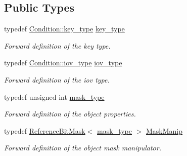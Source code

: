 \subsection*{Public Types}
\begin{DoxyCompactItemize}
\item 
typedef \hyperlink{class_d_d4hep_1_1_conditions_1_1_condition_a7528efa762e8cc072ef80ea67c3531f9}{Condition\+::key\+\_\+type} \hyperlink{class_d_d4hep_1_1_conditions_1_1_interna_1_1_condition_object_a61a3251d047bd75dcdebb0e1c1409101}{key\+\_\+type}
\begin{DoxyCompactList}\small\item\em Forward definition of the key type. \end{DoxyCompactList}\item 
typedef \hyperlink{class_d_d4hep_1_1_conditions_1_1_condition_ad84300e226b2085ec5e9db7f47be5539}{Condition\+::iov\+\_\+type} \hyperlink{class_d_d4hep_1_1_conditions_1_1_interna_1_1_condition_object_a6d54716450a73a1a439ca06445f56d24}{iov\+\_\+type}
\begin{DoxyCompactList}\small\item\em Forward definition of the iov type. \end{DoxyCompactList}\item 
typedef unsigned int \hyperlink{class_d_d4hep_1_1_conditions_1_1_interna_1_1_condition_object_a1a9ff63fe2e060b973e6c2994b0a1370}{mask\+\_\+type}
\begin{DoxyCompactList}\small\item\em Forward definition of the object properties. \end{DoxyCompactList}\item 
typedef \hyperlink{class_d_d4hep_1_1_reference_bit_mask}{Reference\+Bit\+Mask}$<$ \hyperlink{class_d_d4hep_1_1_conditions_1_1_interna_1_1_condition_object_a1a9ff63fe2e060b973e6c2994b0a1370}{mask\+\_\+type} $>$ \hyperlink{class_d_d4hep_1_1_conditions_1_1_interna_1_1_condition_object_a43dfd5df006474f17b7eba59b2f511fe}{Mask\+Manip}
\begin{DoxyCompactList}\small\item\em Forward definition of the object mask manipulator. \end{DoxyCompactList}\end{DoxyCompactItemize}
